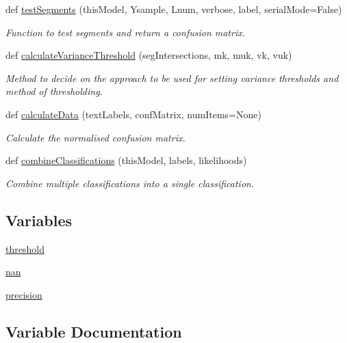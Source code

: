 \begin{DoxyCompactItemize}
def \hyperlink{group__icubclient__SAM__Tests_gab4468c0fd3358f455f808f6e4a4132ea}{test\+Segments} (this\+Model, Ysample, Lnum, verbose, label, serial\+Mode=False)
\begin{DoxyCompactList}\small\item\em Function to test segments and return a confusion matrix. \end{DoxyCompactList}\item 
def \hyperlink{group__icubclient__SAM__Tests_gad2632767e0112bb1762614591096bd95}{calculate\+Variance\+Threshold} (seg\+Intersections, mk, muk, vk, vuk)
\begin{DoxyCompactList}\small\item\em Method to decide on the approach to be used for setting variance thresholds and method of thresholding. \end{DoxyCompactList}\item 
def \hyperlink{group__icubclient__SAM__Tests_ga7ae6c28b9d56e28c26cd320b8d321ff6}{calculate\+Data} (text\+Labels, conf\+Matrix, num\+Items=None)
\begin{DoxyCompactList}\small\item\em Calculate the normalised confusion matrix. \end{DoxyCompactList}\item 
def \hyperlink{group__icubclient__SAM__Tests_ga2475129eb5c2e30ffe652729e98b3fc5}{combine\+Classifications} (this\+Model, labels, likelihoods)
\begin{DoxyCompactList}\small\item\em Combine multiple classifications into a single classification. \end{DoxyCompactList}\end{DoxyCompactItemize}
\subsection*{Variables}
\begin{DoxyCompactItemize}
\item 
\hyperlink{namespaceSAM_1_1SAM__Core_1_1SAMTesting_a338c6277ec5c82cbb28b23746c91dab4}{threshold}
\item 
\hyperlink{namespaceSAM_1_1SAM__Core_1_1SAMTesting_ab60ce5dfd4a21260e14696669b72a66b}{nan}
\item 
\hyperlink{namespaceSAM_1_1SAM__Core_1_1SAMTesting_afa44e72f7c2c88a371fb7933da645ae0}{precision}
\end{DoxyCompactItemize}


\subsection{Variable Documentation}
\mbox{\label{namespaceSAM_1_1SAM__Core_1_1SAMTesting_ab60ce5dfd4a21260e14696669b72a66b}} 
